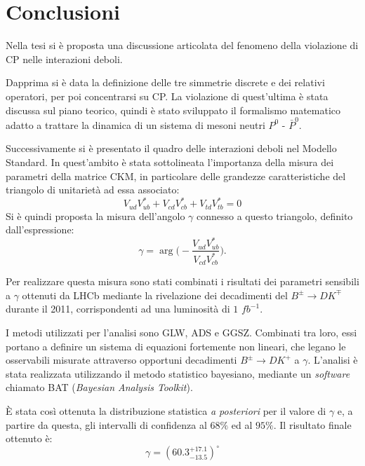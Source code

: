 
\chapter*{Conclusioni}
\noindent
Nella tesi si è proposta una discussione articolata del fenomeno della violazione di CP nelle interazioni deboli. 

Dapprima si è data la definizione delle tre simmetrie discrete e dei relativi operatori, per poi concentrarsi su CP. La violazione di quest'ultima è stata discussa 
sul piano teorico, quindi è stato sviluppato il formalismo matematico adatto a trattare la dinamica di un sistema di mesoni neutri $P^0$ - $\bar{P}^0$.

Successivamente si è presentato il quadro delle interazioni deboli nel Modello Standard. In quest'ambito è stata sottolineata l'importanza della misura  
dei parametri della matrice CKM, in particolare delle grandezze caratteristiche del triangolo di unitarietà ad essa associato:
\begin{equation*}
 V_{ud}V_{ub}^* + V_{cd}V_{cb}^* + V_{td}V_{tb}^* = 0
\end{equation*}
Si è quindi proposta la misura dell'angolo $\gamma$ connesso a questo triangolo, definito dall'espressione:
\begin{equation*}
 \gamma = \arg\Big(-\frac{V_{ud}V_{ub}^*}{V_{cd}V_{cb}^*}\Big).
\end{equation*}

Per realizzare questa misura sono stati combinati i risultati dei parametri sensibili a $\gamma$ ottenuti da LHCb  mediante la rivelazione dei decadimenti del 
$B^{\pm}\rightarrow DK^{\mp}$ durante il 2011, corrispondenti ad una luminosità di $1$ $fb^{-1}$.

I metodi utilizzati per l'analisi sono GLW, ADS e GGSZ. Combinati tra loro, essi portano a definire un sistema di equazioni fortemente non lineari, che legano
le osservabili misurate attraverso opportuni decadimenti $B^{\pm}\rightarrow DK^+$ a $\gamma$. L'analisi è stata realizzata utilizzando il metodo statistico bayesiano,
mediante un \emph{software} chiamato BAT (\emph{Bayesian Analysis Toolkit}).

È stata così ottenuta la distribuzione statistica \emph{a posteriori} per il valore di $\gamma$ e, a partire da questa, gli intervalli di confidenza al $68\%$ ed al $95\%$.
Il risultato finale ottenuto è:
\begin{equation*}
\gamma = (60.3_{-13.5}^{+17.1})^{\circ} 
\end{equation*}

